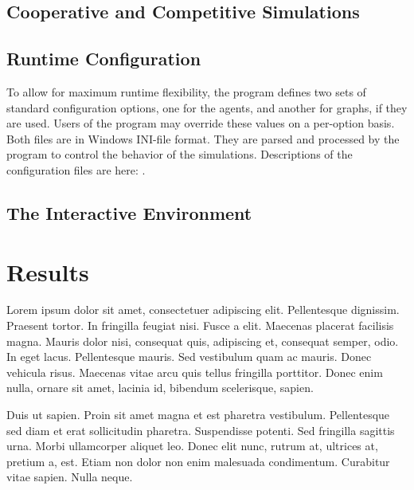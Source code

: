 \documentclass[11pt,letterpaper,onecolumn,twoside,openright,draft]{report}
\begin{document}
\section{Cooperative and Competitive Simulations}

\section{Runtime Configuration}
To allow for maximum runtime flexibility, the program defines two sets of standard configuration options, one for the agents, and another for graphs, if they are used.
Users of the program may override these values on a per-option basis.
Both files are in Windows INI-file format.
They are parsed and processed by the program to control the behavior of the simulations.
Descriptions of the configuration files are here: .

\section{The Interactive Environment}


\chapter{Results}
Lorem ipsum dolor sit amet, consectetuer adipiscing elit. Pellentesque dignissim.
Praesent tortor.
In fringilla feugiat nisi.
Fusce a elit.
Maecenas placerat facilisis magna.
Mauris dolor nisi, consequat quis, adipiscing et, consequat semper, odio.
In eget lacus.
Pellentesque mauris.
Sed vestibulum quam ac mauris.
Donec vehicula risus.
Maecenas vitae arcu quis tellus fringilla porttitor.
Donec enim nulla, ornare sit amet, lacinia id, bibendum scelerisque, sapien.

Duis ut sapien.
Proin sit amet magna et est pharetra vestibulum.
Pellentesque sed diam et erat sollicitudin pharetra.
Suspendisse potenti.
Sed fringilla sagittis urna.
Morbi ullamcorper aliquet leo.
Donec elit nunc, rutrum at, ultrices at, pretium a, est.
Etiam non dolor non enim malesuada condimentum.
Curabitur vitae sapien.
Nulla neque.
\end{document}
